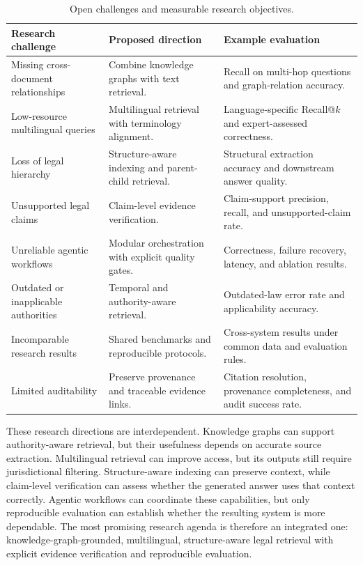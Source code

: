 \begin{table}[tp]
\centering
\caption{Open challenges and measurable research objectives.}
\label{tab:agenda}
\footnotesize
\setlength{\tabcolsep}{5pt}
\renewcommand{\arraystretch}{1.3}
\begin{tabularx}{\textwidth}{>{\raggedright\arraybackslash}p{3.4cm} >{\raggedright\arraybackslash}X >{\raggedright\arraybackslash}X}
\toprule
\textbf{Research challenge} & \textbf{Proposed direction} & \textbf{Example evaluation} \\
\midrule
Missing cross-document relationships & Combine knowledge graphs with text retrieval. & Recall on multi-hop questions and graph-relation accuracy. \\
Low-resource multilingual queries & Multilingual retrieval with terminology alignment. & Language-specific Recall@$k$ and expert-assessed correctness. \\
Loss of legal hierarchy & Structure-aware indexing and parent-child retrieval. & Structural extraction accuracy and downstream answer quality. \\
Unsupported legal claims & Claim-level evidence verification. & Claim-support precision, recall, and unsupported-claim rate. \\
Unreliable agentic workflows & Modular orchestration with explicit quality gates. & Correctness, failure recovery, latency, and ablation results. \\
Outdated or inapplicable authorities & Temporal and authority-aware retrieval. & Outdated-law error rate and applicability accuracy. \\
Incomparable research results & Shared benchmarks and reproducible protocols. & Cross-system results under common data and evaluation rules. \\
Limited auditability & Preserve provenance and traceable evidence links. & Citation resolution, provenance completeness, and audit success rate. \\
\bottomrule
\end{tabularx}
\end{table}

These research directions are interdependent. Knowledge graphs can support authority-aware retrieval, but
their usefulness depends on accurate source extraction. Multilingual retrieval can improve access, but its
outputs still require jurisdictional filtering. Structure-aware indexing can preserve context, while
claim-level verification can assess whether the generated answer uses that context correctly. Agentic
workflows can coordinate these capabilities, but only reproducible evaluation can establish whether the
resulting system is more dependable. The most promising research agenda is therefore an integrated one:
knowledge-graph-grounded, multilingual, structure-aware legal retrieval with explicit evidence
verification and reproducible evaluation.


